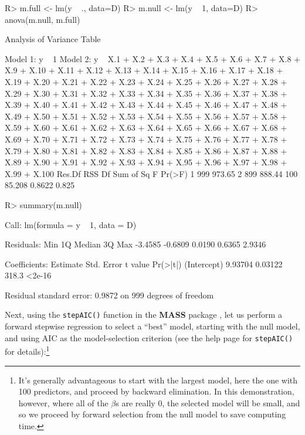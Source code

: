 \documentclass[
]{jss}
\begin{document}
\begin{CodeChunk}
\begin{CodeInput}
R> m.full <- lm(y ~ ., data=D)
R> m.null <- lm(y ~ 1, data=D)
R> anova(m.null, m.full)
\end{CodeInput}
\begin{CodeOutput}
Analysis of Variance Table

Model 1: y ~ 1
Model 2: y ~ X.1 + X.2 + X.3 + X.4 + X.5 + X.6 + X.7 + X.8 + X.9 + X.10 + 
    X.11 + X.12 + X.13 + X.14 + X.15 + X.16 + X.17 + X.18 + X.19 + 
    X.20 + X.21 + X.22 + X.23 + X.24 + X.25 + X.26 + X.27 + X.28 + 
    X.29 + X.30 + X.31 + X.32 + X.33 + X.34 + X.35 + X.36 + X.37 + 
    X.38 + X.39 + X.40 + X.41 + X.42 + X.43 + X.44 + X.45 + X.46 + 
    X.47 + X.48 + X.49 + X.50 + X.51 + X.52 + X.53 + X.54 + X.55 + 
    X.56 + X.57 + X.58 + X.59 + X.60 + X.61 + X.62 + X.63 + X.64 + 
    X.65 + X.66 + X.67 + X.68 + X.69 + X.70 + X.71 + X.72 + X.73 + 
    X.74 + X.75 + X.76 + X.77 + X.78 + X.79 + X.80 + X.81 + X.82 + 
    X.83 + X.84 + X.85 + X.86 + X.87 + X.88 + X.89 + X.90 + X.91 + 
    X.92 + X.93 + X.94 + X.95 + X.96 + X.97 + X.98 + X.99 + X.100
  Res.Df    RSS  Df Sum of Sq      F Pr(>F)
1    999 973.65                            
2    899 888.44 100    85.208 0.8622  0.825
\end{CodeOutput}
\begin{CodeInput}
R> summary(m.null)
\end{CodeInput}
\begin{CodeOutput}

Call:
lm(formula = y ~ 1, data = D)

Residuals:
    Min      1Q  Median      3Q     Max 
-3.4585 -0.6809  0.0190  0.6365  2.9346 

Coefficients:
            Estimate Std. Error t value Pr(>|t|)
(Intercept)  9.93704    0.03122   318.3   <2e-16

Residual standard error: 0.9872 on 999 degrees of freedom
\end{CodeOutput}
\end{CodeChunk}

Next, using the \texttt{stepAIC()} function in the \textbf{MASS} package
\citep{VenablesRipley:2002}, let us perform a forward stepwise
regression to select a ``best'' model, starting with the null model, and
using AIC as the model-selection criterion (see the help page for
\texttt{stepAIC()} for details):\footnote{It's generally advantageous to
  start with the largest model, here the one with 100 predictors, and
  proceed by backward elimination. In this demonstration, however, where
  all of the \(\beta\)s are really 0, the selected model will be small,
  and so we proceed by forward selection from the null model to save
  computing time.}
\end{document}
